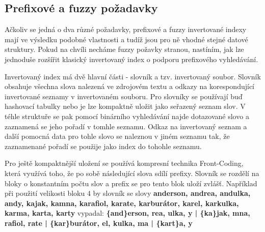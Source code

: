 \documentclass[11pt]{article}
\begin{document}
\subsection{Prefixové a fuzzy požadavky}
Ačkoliv se jedná o dva různé požadavky, prefixové a fuzzy invertované indexy
mají ve výsledku podobné vlastnosti a tudíž jsou pro ně vhodné stejné datové
struktury. Pokud na chvíli necháme fuzzy požavky stranou, nastíním, jak lze
jednoduše rozšířit klasický invertovaný index o podporu prefixového
vyhledávání.

Invertovaný index má dvě hlavní části - slovník a tzv. invertovaný soubor.
Slovník obsahuje všechna slova nalezená ve zdrojovém textu a odkazy na
korespondující invertované seznamy v invertovaném souboru. Pro slovníky se
používají buď hashovací tabulky nebo je lze kompaktně uložit jako seřazený
seznam slov. V téhle struktuře se pak pomocí binárního vyhledávání najde
dotazované slovo a zaznamená se jeho pořadí v tomhle seznamu. Odkaz na
invertovaný seznam a další pomocná data pro tohle slovo se naleznou v jiném
seznamu tak, že zaznamenané pořadí se použije jako index do tohohle seznamu.

%

Pro ještě kompaktnější uložení se používá kompresní technika Front-Coding,
která využívá toho, že po sobě následující slova sdílí prefixy. Slovník se
rozdělí na bloky o konstantním počtu slov a prefix se pro tento blok uloží
zvlášť. Například při použití velikosti bloku 4 by slovník se slovy
\textbf{anderson, andrea, andulka, andy, kajak, kamna, karafiol, karate,
karburátor, karel, karkulka, karma, karta, karty} vypadal:
\textbf{\{and\}erson, rea, ulka, y | \{ka\}jak, mna, rafiol, rate | \{kar\}burátor, el, kulka, ma | \{kart\}a, y}
\end{document}
